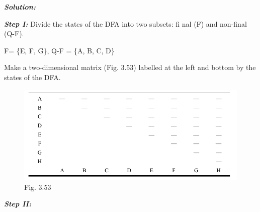 \documentclass[11pt,apacite]{article}
\begin{document}
\emph{\textbf{Solution:}}

\emph{\textbf{Step I:}} Divide the states of the DFA into two subsets: fi nal (F) and non-final (Q-F).\\
\begin{center}
	F=  \{E, F, G\}, Q-F =  \{A, B, C, D\}
\end{center}
Make a two-dimensional matrix (Fig. 3.53) labelled at the left and bottom by the states of the DFA.
\begin{figure}[H]
	\begin{center}
		\begin{center}
		\includegraphics[scale=.45]{Fig353.png}
		\end{center}
		\caption{Fig. 3.53}
	\end{center}
\end{figure}
\emph{\textbf{Step II:}}
\end{document}
